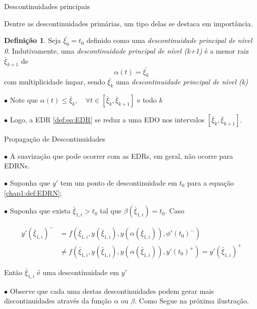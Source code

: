 \documentclass{beamer}
\theoremstyle{plain}
\theoremstyle{definition}
\newtheorem{defi}{Definição}
\begin{document}


\begin{frame}{Descontinuidades principais}

    \small

    Dentre as descontinuidades primárias, um tipo delas se destaca em importância.

    \begin{defi}
        \label{chap2:def:principal_descontinuity}
    Seja $\bar{\xi_0} = t_0$ definido como uma \textit{descontinuidade principal de nível 0}. Indutivamente, uma \textit{descontinuidade principal de nível (k+1)} é a menor raiz $\bar{\xi}_{k+1}$ de 
        \[
            \alpha(t) = \bar{\xi_k}
        \]
        com multiplicidade ímpar, sendo $\bar{\xi_k}$ uma \textit{descontinuidade principal de nível (k)}
    \end{defi}


    $\bullet$ Note que $ \alpha(t) \leq \bar{\xi}_{k}, \quad \forall t \in\left[\bar{\xi}_{k}, \bar{\xi}_{k+1}\right] $ e todo $k$

    $\bullet$ Logo, a EDR \eqref{def:eq:EDR} se reduz a uma EDO nos intervalos $\left[\bar{\xi}_{k}, \bar{\xi}_{k+1}\right]$. 

\end{frame}



\begin{frame}{Propagação de Descontinuidades}
     
    $\bullet$ A suavização que pode ocorrer com as EDRs, em geral, não ocorre para EDRNs. 

    $\bullet$ Suponha que $y'$ tem um ponto de descontinuidade em $t_0$ para a equação \ref{chap1:def:EDRN};

    $\bullet$ Suponha que exista $\bar{\xi}_{1, i} > t_0$ tal que $\beta(\bar{\xi}_{1, i}) = t_0$. Caso

    \footnotesize
    \begin{equation}
        \begin{split}
            y'(\bar{\xi}_{1, i})^- &= f(\bar{\xi}_{1, i}, y(\bar{\xi}_{1, i}), y(\alpha(\bar{\xi}_{1, i})), \phi'(t_0)^-)  \\
                                   &\neq f(\bar{\xi}_{1, i}, y(\bar{\xi}_{1, i}), y(\alpha(\bar{\xi}_{1, i})), y'(t_0)^+) 
                                   = y'(\bar{\xi}_{1, i})^+
        \end{split}
        \label{chap2:eq:disco:edrn}
    \end{equation}

    \normalsize
    Então $\bar{\xi}_{1, i}$ é uma descontínuidade em $y'$

    $\bullet$ Observe que cada uma destas descontinuidades podem gerar mais discontinuidades através da função $\alpha$ ou $\beta$. Como Segue na próxima ilustração.

\end{frame}
\end{document}
